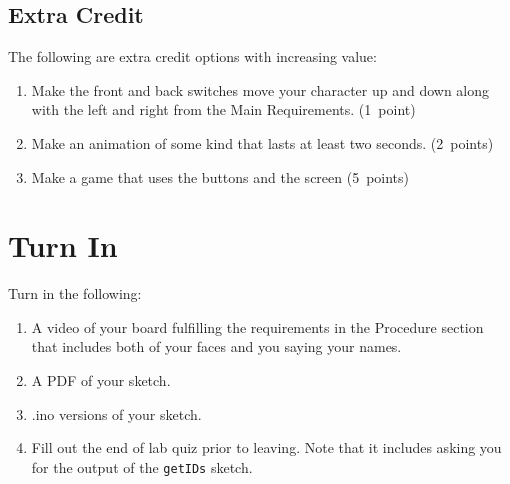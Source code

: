 \subsection{Extra Credit}
The following are extra credit options with increasing value:
\begin{enumerate}
    \item Make the front and back switches move your character up and down along 
            with the left and right from the Main Requirements. (1~point)
    \item Make an animation of some kind that lasts at least two seconds. (2~points)
    \item Make a game that uses the buttons and the screen (5~points)
\end{enumerate}

\section{Turn In}
Turn in the following:
\begin{enumerate}
    \item A video of your board fulfilling the requirements in the Procedure section 
            that includes both of your faces and you saying your names.
    \item A PDF of your sketch.
    \item .ino versions of your sketch.
    \item Fill out the end of lab quiz prior to leaving. Note that it includes asking you 
            for the output of the \lstinline$getIDs$ sketch. 
\end{enumerate}